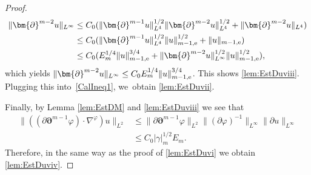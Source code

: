 \documentclass[10pt]{amsart}
\theoremstyle{definition}
\begin{document}
\begin{proof}
\begin{align*}
\|\bm{\partial}^{m-2} u\|_{L^\infty}
&\leq C_0 (\|\bm{\partial}^{m-1} u\|_{L^4}^{1/2} \|\bm{\partial}^{m-2} u\|_{L^4}^{1/2} + \|\bm{\partial}^{m-2} u\|_{L^4}) \\
&\leq C_0 (\|\bm{\partial}^{m-1} u\|_{L^4}^{1/2} \|u\|_{m-1,{\rm e}}^{1/2} + \|u\|_{m-1,{\rm e}}) \\
&\leq C_0 (E_m^{1/4}\|u\|_{m-1,{\rm e}}^{3/4} + \|\bm{\partial}^{m-2}u\|_{L^\infty}^{1/2}\|u\|_{m-1,{\rm e}}^{1/2}),
\end{align*}
which yields $\|\bm{\partial}^{m-2} u\|_{L^\infty} \leq C_0E_m^{1/4}\|u\|_{m-1,{\rm e}}^{3/4}$.
This shows \eqref{lem:EstDuviii}.
Plugging this into~\eqref{CalIneq1}, we~obtain \eqref{lem:EstDuvii}.

Finally, by Lemma \ref{lem:EstDM} and \eqref{lem:EstDuviii} we see that
\begin{align*}
\|((\partial\bm{\partial}^{m-1}\varphi)\cdot\nabla^\varphi)u\|_{L^2}
&\leq \|\partial\bm{\partial}^{m-1}\varphi\|_{L^2} \|(\partial\varphi)^{-1}\|_{L^\infty} \|\partial u\|_{L^\infty} \\
&\leq C_0|\gamma|_m^{1/2}E_m.
\end{align*}
Therefore, in the same way as the proof of \eqref{lem:EstDuvi} we obtain \eqref{lem:EstDuviv}.
\end{proof}
\end{document}
